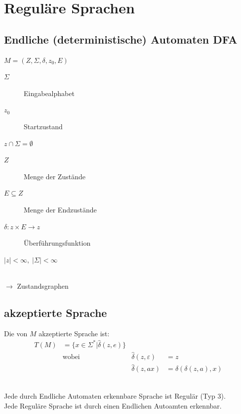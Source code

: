 \documentclass{scrartcl}
\begin{document}
\section*{Reguläre Sprachen}
\subsection*{Endliche (deterministische) Automaten DFA}
\begin{minipage}{6cm}
    $M = \left(Z,\Sigma,\delta,z_0,E\right)$
    \begin{description}
        \item[$\Sigma$] Eingabealphabet
        \item[$z_0$] Startzustand
        \item[$z\cap\Sigma = \emptyset$]
    \end{description}
\end{minipage}
\begin{minipage}{5.5cm}
\begin{description}
    \item[$Z$] Menge der Zustände
    \item[$E\subseteq Z$] Menge der Endzustände
    \item[$\delta: z\times E\to z$] Überführungsfunktion
    \item[$|z|< \infty,\; |\Sigma |<\infty$]
\end{description}
\end{minipage}\\
$\to$ Zustandsgraphen

\subsection*{akzeptierte Sprache}
Die von $M$ akzeptierte Sprache ist:
\begin{align*}
    T(M) &= \{x\in\Sigma^* \vert \hat\delta(z,e)\} \\
    & \textrm{wobei} & \hat\delta(z,\varepsilon)&=z \\
    & & \hat\delta(z,ax) &= \hat\delta\left(\delta(z,a),x\right)
\end{align*}

\begin{shaded}
    \ \\ Jede durch Endliche Automaten erkennbare Sprache ist Regulär (Typ 3).\\
    Jede Reguläre Sprache ist durch einen Endlichen Autoamten erkennbar.
\end{shaded}
\end{document}
